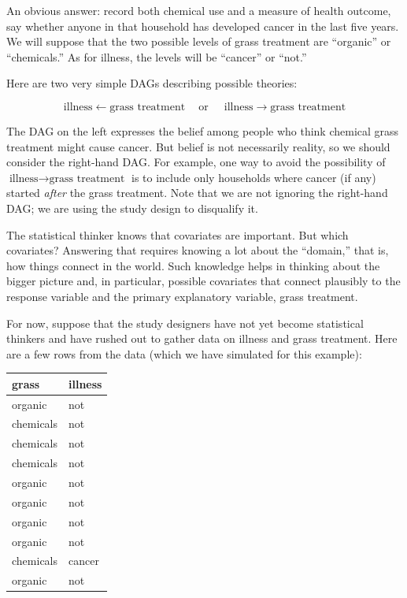 \documentclass[
  letterpaper,
  DIV=11,
  numbers=noendperiod,
  oneside]{scrreprt}
\begin{document}
An obvious answer: record both chemical use and a measure of health
outcome, say whether anyone in that household has developed cancer in
the last five years. We will suppose that the two possible levels of
grass treatment are ``organic'' or ``chemicals.'' As for illness, the
levels will be ``cancer'' or ``not.''

Here are two very simple DAGs describing possible theories:

\[\text{illness} \leftarrow \text{grass treatment}\ \ \ \ \text{ or   }\ \ \ \ \ \text{illness} \rightarrow \text{grass treatment}\]

The DAG on the left expresses the belief among people who think chemical
grass treatment might cause cancer. But belief is not necessarily
reality, so we should consider the right-hand DAG. For example, one way
to avoid the possibility of
\(\text{illness} \rightarrow \text{grass treatment}\) is to include only
households where cancer (if any) started \emph{after} the grass
treatment. Note that we are not ignoring the right-hand DAG; we are
using the study design to disqualify it.

The statistical thinker knows that covariates are important. But which
covariates? Answering that requires knowing a lot about the ``domain,''
that is, how things connect in the world. Such knowledge helps in
thinking about the bigger picture and, in particular, possible
covariates that connect plausibly to the response variable and the
primary explanatory variable, grass treatment.

For now, suppose that the study designers have not yet become
statistical thinkers and have rushed out to gather data on illness and
grass treatment. Here are a few rows from the data (which we have
simulated for this example):

\ttfamily 
\begin{tabular}{ll}
\toprule
grass & illness\\
\midrule
organic & not\\
chemicals & not\\
chemicals & not\\
chemicals & not\\
organic & not\\
\addlinespace
organic & not\\
organic & not\\
organic & not\\
chemicals & cancer\\
organic & not\\
\bottomrule
\end{tabular} \normalfont
\bigskip
\end{document}
